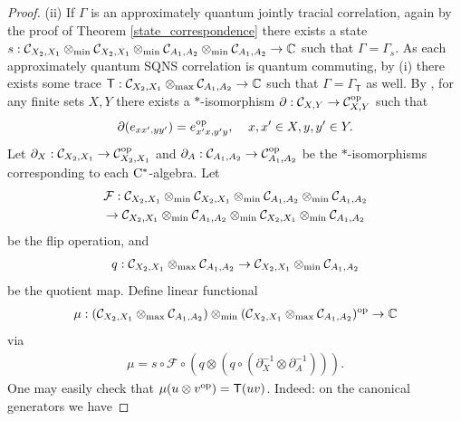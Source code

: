 \documentclass[11pt]{amsart}
\newcommand{\cl}[1]{\mathcal{#1}}
\newcommand{\bb}[1]{\mathbb{#1}}
\begin{document}
\begin{proof}
(ii) If $\Gamma$ is an approximately quantum jointly tracial correlation, again by the proof of Theorem \ref{state_correspondence} there exists a state $s :\cl{C}_{X_{2}, X_{1}}\otimes_{\rm min} \cl{C}_{X_{2}, X_{1}}\otimes_{\rm min} \cl{C}_{A_{1}, A_{2}}\otimes_{\rm min} \cl{C}_{A_{1}, A_{2}}\rightarrow \bb{C}$ such that $\Gamma = \Gamma_{s}$. As each approximately quantum SQNS correlation is quantum commuting, by (i) there exists some trace $\mathsf{T} : \cl{C}_{X_{2}, X_{1}}\otimes_{\rm max} \cl{C}_{A_{1}, A_{2}}\rightarrow \bb{C}$ such that $\Gamma = \Gamma_{\mathsf{T}}$ as well. By \cite[Lemma 9.2]{tt}, for any finite sets $X, Y$ there exists a $*$-isomorphism $\partial: \cl{C}_{X, Y}\rightarrow \cl{C}_{X, Y}^{\rm op}$ such that
\begin{gather*}
	\partial(e_{xx', yy'}) = e_{x'x, y'y}^{\rm op}, \;\;\;\; x, x' \in X, y, y' \in Y.
\end{gather*}
\noindent Let $\partial_{X}: \cl{C}_{X_{2}, X_{1}}\rightarrow \cl{C}_{X_{2}, X_{1}}^{\rm op}$ and $\partial_{A}: \cl{C}_{A_{1}, A_{2}}\rightarrow \cl{C}_{A_{1}, A_{2}}^{\rm op}$ be the $*$-isomorphisms corresponding to each ${\rm C}^{*}$-algebra. Let
\begin{gather*}
	\cl{F}: \cl{C}_{X_{2}, X_{1}}\otimes_{\rm min} \cl{C}_{X_{2}, X_{1}}\otimes_{\rm min} \cl{C}_{A_{1}, A_{2}}\otimes_{\rm min} \cl{C}_{A_{1}, A_{2}} \\\rightarrow \cl{C}_{X_{2}, X_{1}}\otimes_{\rm min} \cl{C}_{A_{1}, A_{2}}\otimes_{\rm min} \cl{C}_{X_{2}, X_{1}}\otimes_{\rm min} \cl{C}_{A_{1}, A_{2}}
\end{gather*}
\noindent be the flip operation, and 
\begin{gather*}
	q: \cl{C}_{X_{2}, X_{1}}\otimes_{\rm max} \cl{C}_{A_{1}, A_{2}}\rightarrow \cl{C}_{X_{2}, X_{1}}\otimes_{\rm min} \cl{C}_{A_{1}, A_{2}}
\end{gather*}
\noindent be the quotient map. Define linear functional
\begin{gather*}
	\mu: (\cl{C}_{X_{2}, X_{1}}\otimes_{\rm max} \cl{C}_{A_{1}, A_{2}})\otimes _{\rm min} (\cl{C}_{X_{2}, X_{1}}\otimes_{\rm max} \cl{C}_{A_{1}, A_{2}})^{\rm op} \rightarrow \bb{C}
\end{gather*}
\noindent via
\begin{gather*}
	\mu = s\circ \cl{F}\circ (q\otimes (q\circ (\partial_{X}^{-1}\otimes \partial_{A}^{-1}))).
\end{gather*}
\noindent One may easily check that $\mu(u \otimes v^{\rm op}) = \mathsf{T}(uv)$. Indeed: on the canonical generators we have

\end{proof}
\end{document}
